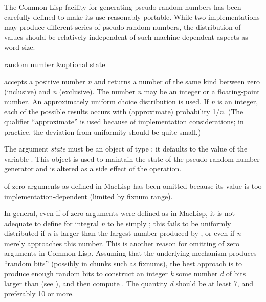 The Common Lisp facility for generating pseudo-random numbers has
been carefully defined to make its use reasonably portable.
While two implementations may produce different series
of pseudo-random numbers, the distribution of values should
be relatively independent of such machine-dependent aspects
as word size.

\begin{defun}[Function]
random number &optional state

 accepts a positive number {\it n} and returns
a number of the same kind between zero (inclusive) and {\it n} (exclusive).
The number {\it n} may be an integer or a floating-point number.
An approximately uniform choice distribution is used.
If {\it n} is an integer, each of the possible results
occurs with (approximate) probability 1/{\it n}.
(The qualifier ``approximate'' is used because of implementation
considerations; in practice, the deviation from uniformity should be
quite small.)

The argument {\it state} must be an object of type ;
it defaults to the value of the variable .
This object is used to maintain the state of the pseudo-random-number
generator and is altered as a side effect of the  operation.

\beforenoterule
\begin{incompatibility}
 of zero arguments as defined in MacLisp
has been omitted because
its value is too implementation-dependent (limited by fixnum range).
\end{incompatibility}
\betweennoterule
\begin{implementation}
In general, even if  of zero arguments
were defined as in MacLisp,
it is not adequate to define  for integral {\it n}
to be simply ; this fails to be uniformly distributed
if {\it n} is larger than the largest number produced by ,
or even if {\it n} merely approaches this number.
This is another reason for omitting  of zero arguments in Common Lisp.
Assuming that the underlying mechanism produces ``random bits''
(possibly in chunks such as fixnums), the best approach is to produce
enough random bits to construct an integer {\it k} some number {\it d} of bits
larger than  (see ), and
then compute .  The quantity {\it d} should be at
least 7, and preferably 10 or more.


\end{implementation}
\end{defun}
